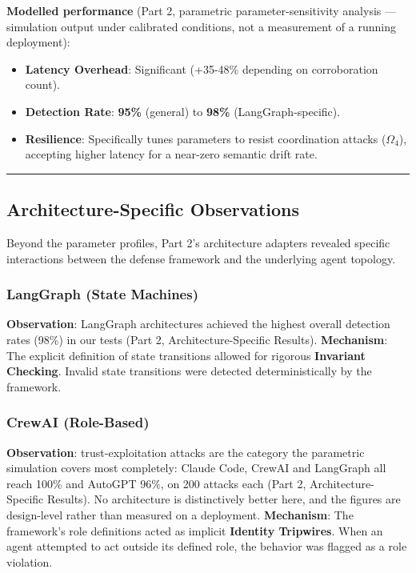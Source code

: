 \documentclass[
]{article}
\providecommand{\tightlist}{%
  \setlength{\itemsep}{0pt}\setlength{\parskip}{0pt}}
\begin{document}
\textbf{Modelled performance} (Part 2, parametric parameter-sensitivity
analysis --- simulation output under calibrated conditions, not a
measurement of a running deployment):

\begin{itemize}
\tightlist
\item
  \textbf{Latency Overhead}: Significant (+35-48\% depending on
  corroboration count).
\item
  \textbf{Detection Rate}: \textbf{95\%} (general) to \textbf{98\%}
  (LangGraph-specific).
\item
  \textbf{Resilience}: Specifically tunes parameters to resist
  coordination attacks (\(\Omega_4\)), accepting higher latency for a
  near-zero semantic drift rate.
\end{itemize}

\begin{center}\rule{0.5\linewidth}{0.5pt}\end{center}

\subsection{Architecture-Specific
Observations}\label{architecture-specific-observations}

Beyond the parameter profiles, Part 2's architecture adapters revealed
specific interactions between the defense framework and the underlying
agent topology.

\subsubsection{LangGraph (State
Machines)}\label{langgraph-state-machines}

\textbf{Observation}: LangGraph architectures achieved the highest
overall detection rates (98\%) in our tests (Part 2,
Architecture-Specific Results). \textbf{Mechanism}: The explicit
definition of state transitions allowed for rigorous \textbf{Invariant
Checking}. Invalid state transitions were detected deterministically by
the framework.

\subsubsection{CrewAI (Role-Based)}\label{crewai-role-based}

\textbf{Observation}: trust-exploitation attacks are the category the
parametric simulation covers most completely: Claude Code, CrewAI and
LangGraph all reach 100\% and AutoGPT 96\%, on 200 attacks each (Part 2,
Architecture-Specific Results). No architecture is distinctively better
here, and the figures are design-level rather than measured on a
deployment. \textbf{Mechanism}: The framework's role definitions acted
as implicit \textbf{Identity Tripwires}. When an agent attempted to act
outside its defined role, the behavior was flagged as a role violation.
\end{document}
